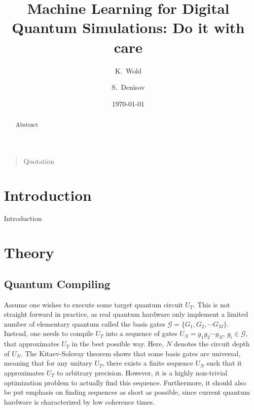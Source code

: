 \documentclass[%
 aip,
 floatfix,
 amsmath,amssymb,
 reprint,%
]{revtex4-1}
\begin{document}

\title{Machine Learning for Digital Quantum Simulations: Do it with care 
}

\author{K.~Wold}

\author{S.~Denisov}

\date{\today}

\begin{abstract}
Abstract
\end{abstract}

\maketitle

\begin{quotation}
Quotation
\end{quotation}


\section{Introduction\label{sec:1}}
Introduction

\section{Theory \label{sec:2}}

\subsection{Quantum Compiling}



Assume one wishes to execute some target quantum circuit $U_T$. This is not straight forward in practice, as real quantum hardware only implement a limited number of elementary quantum called the basis gates $\mathcal{G} = \{G_1, G_2, \cdots G_M\}$. Instead, one needs to compile $U_T$ into a sequence of gates $U_N = g_1 g_{2} \cdots g_N$, $g_i \in \mathcal{G}$, that approximates $U_T$ in the best possible way. Here, $N$ denotes the circuit depth of $U_N$. The Kitaev-Solovay theorem shows that some basis gates are universal, meaning that for any unitary $U_T$, there exists a finite sequence $U_N$ such that it approximates $U_T$ to arbitrary precision\cite{dawson2005solovaykitaev}. However, it is a highly non-trivial optimization problem to actually find this sequence. Furthermore, it should also be put emphasis on finding sequences as short as possible, since current quantum hardware is characterized by low coherence times.
\end{document}
